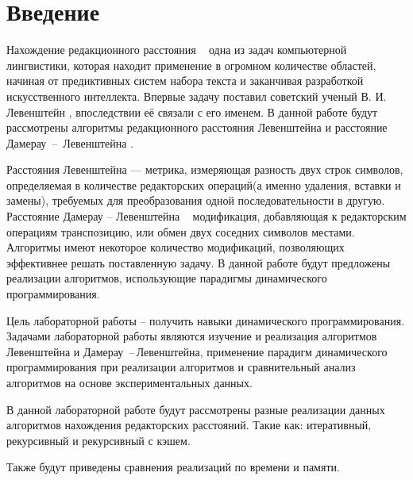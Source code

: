 \chapter*{Введение}

Нахождение редакционного расстояния ~ одна из задач компьютерной лингвистики, которая находит применение в огромном количестве областей, начиная от предиктивных систем набора текста и заканчивая разработкой искусственного интеллекта. Впервые задачу поставил советский ученый В. И. Левенштейн \cite{Lev1965}, впоследствии её связали с его именем. В данной работе будут рассмотрены алгоритмы редакционного расстояния Левенштейна и расстояние Дамерау \,--\, Левенштейна \cite{damerau}.

Расстояния Левенштейна --- метрика, измеряющая разность двух строк символов, определяемая в количестве редакторских операций(а именно удаления, вставки и замены), требуемых для преобразования одной последовательности в другую.  Расстояние Дамерау -- Левенштейна ~ модификация, добавляющая к редакторским операциям транспозицию, или обмен двух соседних символов местами.
Алгоритмы имеют некоторое количество модификаций, позволяющих эффективнее решать поставленную задачу. В данной работе будут предложены реализации алгоритмов, использующие парадигмы динамического программирования. 


Цель лабораторной работы -- получить навыки динамического программирования. 
Задачами лабораторной работы являются изучение и реализация алгоритмов Левенштейна и Дамерау \,--\,Левенштейна, применение парадигм динамического программирования при реализации алгоритмов и сравнительный анализ алгоритмов на основе экспериментальных данных.

В данной лабораторной работе будут рассмотрены разные реализации данных алгоритмов нахождения редакторских расстояний. Такие как: итеративный, рекурсивный и рекурсивный с кэшем. 

Также будут приведены сравнения реализаций по времени и памяти.